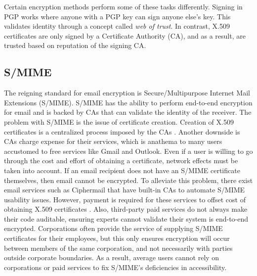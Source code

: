 \documentclass{sig-alternate-05-2015}
\begin{document}
Certain encryption methods perform some of these tasks differently. Signing in PGP works where anyone with a PGP key can sign anyone else's key. This validates identity through a concept called \textit{web of trust}. In contrast, X.509 certificates are only signed by a Certificate Authority (CA), and as a result, are trusted based on reputation of the signing CA.

\subsection{S/MIME}
\par The reigning standard for email encryption is Secure/Multipurpose Internet Mail Extensions (S/MIME). S/MIME has the ability to perform end-to-end encryption for email and is backed by CAs that can validate the identity of the receiver. The problem with S/MIME is the issue of certificate creation. Creation of X.509 certificates is a centralized process imposed by the CAs \cite{garfinkel2005johnny}. Another downside is CAs charge expense for their services, which is anathema to many users accustomed to free services like Gmail and Outlook. Even if a user is willing to go through the cost and effort of obtaining a certificate, network effects must be taken into account. If an email recipient does not have an S/MIME certificate themselves, then email cannot be encrypted. To alleviate this problem, there exist email services such as Ciphermail that have built-in CAs to automate S/MIME usability issues. However, payment is required for these services to offset cost of obtaining X.509 certificates \cite{ciphermail-gateway}. Also, third-party paid services do not always make their code auditable, ensuring experts cannot validate their system is end-to-end encrypted. Corporations often provide the service of supplying S/MIME certificates for their employees, but this only ensures encryption will occur between members of the same corporation, and not necessarily with parties outside corporate boundaries. As a result, average users cannot rely on corporations or paid services to fix S/MIME's deficiencies in accessibility.
\end{document}
